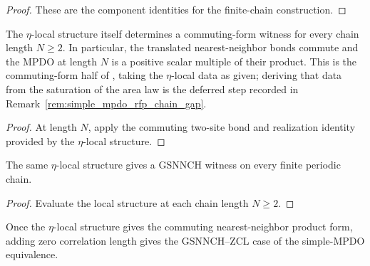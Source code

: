 \begin{proof}\leanok
    These are the component identities for the finite-chain construction.
\end{proof}

\begin{theorem}
    \label{thm:mpdo_eta_local_structure_has_commuting_form}
    \leanok
    The $\eta$-local structure itself determines a commuting-form witness for every
    chain length $N \ge 2$. In particular, the translated nearest-neighbor
    bonds commute and the MPDO at length $N$ is a positive scalar multiple of
    their product. This is the commuting-form half of
    \cite[Proposition~C.8]{Cirac2016MPDO_arXiv}, taking the $\eta$-local data as
    given; deriving that data from the saturation of the area law is the
    deferred step recorded in Remark~\ref{rem:simple_mpdo_rfp_chain_gap}.
\end{theorem}

\begin{proof}\leanok
    At length $N$, apply the commuting two-site bond and realization identity
    provided by the $\eta$-local structure.
\end{proof}

\begin{theorem}
    \label{thm:mpdo_eta_local_structure_is_gsnnch}
    \leanok
    The same $\eta$-local structure gives a GSNNCH witness on every finite
    periodic chain.
\end{theorem}

\begin{proof}\leanok
    Evaluate the local structure at each chain length $N \ge 2$.
\end{proof}

\begin{theorem}
    \label{thm:mpdo_eta_local_structure_is_gsnnch_zcl}
    \leanok
    Once the $\eta$-local structure gives the commuting nearest-neighbor
    product form, adding zero correlation length gives the GSNNCH--ZCL case
    of the simple-MPDO equivalence.
\end{theorem}

